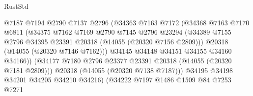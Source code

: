 \begin{lexlean}{RustStd}
\begin{coremodule}
                                    @7187
                                    @7194
                                    @2790
                                    @7137
                                    @2796
                                    (@34363
                                      @7163
                                      @7172
                                      (@34368
                                        @7163
                                        @7170
                                        @6811
                                        (@34375
                                          @7162
                                          @7169
                                          @2790
                                          @7145
                                          @2796
                                          @23294
                                          (@34389
                                            @7155
                                            @2796
                                            @34395
                                            @23391
                                            @20318
                                            (@14055 (@20320 @7156 @2809)))
                                          @20318
                                          (@14055 (@20320 @7146 @7162)))
                                        @34145
                                        @34148
                                        @34151
                                        @34155
                                        @34160
                                        @34166))
                                    (@34177
                                      @7180
                                      @2796
                                      @23377
                                      @23391
                                      @20318
                                      (@14055 (@20320 @7181 @2809)))
                                    @20318
                                    (@14055 (@20320 @7138 @7187)))
                                  @34195
                                  @34198
                                  @34201
                                  @34205
                                  @34210
                                  @34216)
                                (@34222
                                  @7197
                                  @1486
                                  @1509
                                  @84
                                  @7253
                                  @7271

\end{coremodule}
\end{lexlean}
